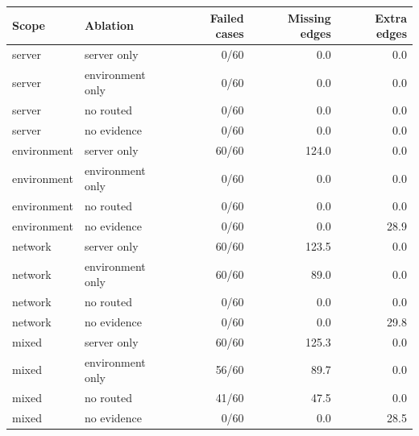 \begin{tabular}{llrrr}
\hline
Scope & Ablation & Failed cases & Missing edges & Extra edges \\
\hline
server & server only & 0/60 & 0.0 & 0.0 \\
server & environment only & 0/60 & 0.0 & 0.0 \\
server & no routed & 0/60 & 0.0 & 0.0 \\
server & no evidence & 0/60 & 0.0 & 0.0 \\
environment & server only & 60/60 & 124.0 & 0.0 \\
environment & environment only & 0/60 & 0.0 & 0.0 \\
environment & no routed & 0/60 & 0.0 & 0.0 \\
environment & no evidence & 0/60 & 0.0 & 28.9 \\
network & server only & 60/60 & 123.5 & 0.0 \\
network & environment only & 60/60 & 89.0 & 0.0 \\
network & no routed & 0/60 & 0.0 & 0.0 \\
network & no evidence & 0/60 & 0.0 & 29.8 \\
mixed & server only & 60/60 & 125.3 & 0.0 \\
mixed & environment only & 56/60 & 89.7 & 0.0 \\
mixed & no routed & 41/60 & 47.5 & 0.0 \\
mixed & no evidence & 0/60 & 0.0 & 28.5 \\
\hline
\end{tabular}
